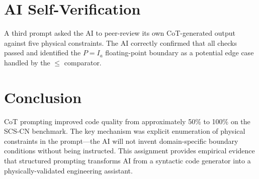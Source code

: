 \documentclass[12pt,a4paper]{article}
\begin{document}
\section{AI Self-Verification}
A third prompt asked the AI to peer-review its own CoT-generated output against five physical constraints. The AI correctly confirmed that all checks passed and identified the $P = I_a$ floating-point boundary as a potential edge case handled by the $\leq$ comparator.

\section{Conclusion}
CoT prompting improved code quality from approximately 50\% to 100\% on the SCS-CN benchmark. The key mechanism was explicit enumeration of physical constraints in the prompt—the AI will not invent domain-specific boundary conditions without being instructed. This assignment provides empirical evidence that structured prompting transforms AI from a syntactic code generator into a physically-validated engineering assistant.
\end{document}
